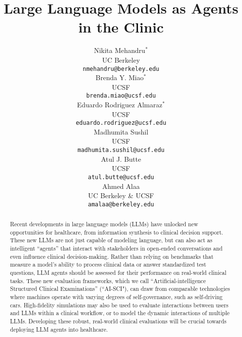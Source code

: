 \documentclass[10pt]{article}
\title{Large Language Models as Agents in the Clinic}
\author{
 Nikita Mehandru$^*$ \\
UC Berkeley\\
\texttt{nmehandru@berkeley.edu} \\
 \And
 Brenda Y. Miao$^*$ \\
UCSF \\
\texttt{brenda.miao@ucsf.edu} \\
\And
 Eduardo Rodriguez Almaraz$^*$ \\
UCSF \\
\texttt{eduardo.rodriguez@ucsf.edu} \\
\And
 Madhumita Sushil \\
UCSF \\
\texttt{madhumita.sushil@ucsf.edu} \\
\And
 Atul J. Butte \\
UCSF \\
\texttt{atul.butte@ucsf.edu} \\
\And
 Ahmed Alaa \\
UC Berkeley \& UCSF \\
\texttt{amalaa@berkeley.edu} \\
}
\begin{document}
\maketitle
\def\thefootnote{*}\def\thefootnote{\arabic{footnote}}

\begin{abstract}
Recent developments in large language models (LLMs) have unlocked new opportunities for healthcare, from information synthesis to clinical decision support. These new LLMs are not just capable of modeling language, but can also act as intelligent “agents” that interact with stakeholders in open-ended conversations and even influence clinical decision-making. Rather than relying on benchmarks that measure a model’s ability to process clinical data or answer standardized test questions, LLM agents should be assessed for their performance on real-world clinical tasks. These new evaluation frameworks, which we call “Artificial-intelligence Structured Clinical Examinations” (“AI-SCI"), can draw from comparable technologies where machines operate with varying degrees of self-governance, such as self-driving cars. High-fidelity simulations may also be used to evaluate interactions between users and LLMs within a clinical workflow, or to model the dynamic interactions of multiple LLMs. Developing these robust, real-world clinical evaluations will be crucial towards deploying LLM agents into healthcare.
\end{abstract}
\vspace{12pt}
\end{document}
